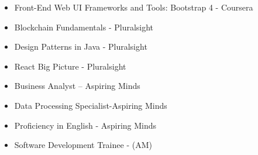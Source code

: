 \medskip
{}

\begin{itemize}
    \item Front-End Web UI Frameworks and Tools: Bootstrap 4  - Coursera
    \item Blockchain Fundamentals - Pluralsight
    \item Design Patterns in Java - Pluralsight
    \item React Big Picture - Pluralsight
    
    \item Business Analyst – Aspiring Minds
    \item Data Processing Specialist-Aspiring Minds
    \item Proficiency in English - Aspiring Minds
    \item Software Development Trainee - (AM)
\end{itemize}
